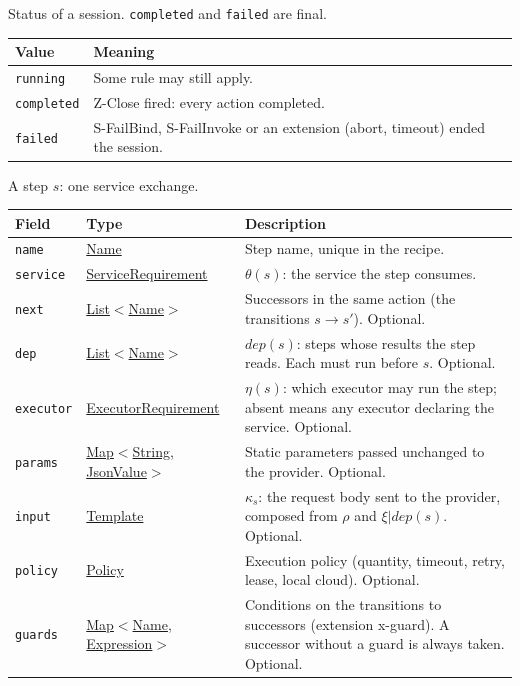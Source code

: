 \documentclass[a4paper]{arrowhead}
\newcommand{\mref}[1]{{\textcolor{ArrowheadPurple}{\hyperref[sec:model:#1]{#1}}}}
\newcommand{\pref}[1]{{\textcolor{ArrowheadGrey}{\hyperref[sec:model:primitives:#1]{#1}}}}
\begin{document}
Status of a session. \texttt{completed} and \texttt{failed} are final.

{\small
\begin{longtable}{|p{3.9cm}|p{11.9cm}|}

\hline
\rowcolor{gray!33} Value & Meaning \\ \hline
\endhead
\texttt{running} & Some rule may still apply. \\ \hline
\texttt{completed} & Z-Close fired: every action completed. \\ \hline
\texttt{failed} & S-FailBind, S-FailInvoke or an extension (abort, timeout) ended the session. \\ \hline
\end{longtable}
}

A step $s$: one service exchange.

{\small
\begin{longtable}{|p{3.9cm}|p{4.4cm}|p{7.5cm}|}

\hline
\rowcolor{gray!33} Field & Type & Description \\ \hline
\endhead
\texttt{name} & \pref{Name} & Step name, unique in the recipe. \\ \hline
\texttt{service} & \mref{ServiceRequirement} & $\theta(s)$: the service the step consumes. \\ \hline
\texttt{next} & \pref{List}$<$\pref{Name}$>$ & Successors in the same action (the transitions $s \rightarrow s'$). Optional. \\ \hline
\texttt{dep} & \pref{List}$<$\pref{Name}$>$ & $dep(s)$: steps whose results the step reads. Each must run before $s$. Optional. \\ \hline
\texttt{executor} & \mref{ExecutorRequirement} & $\eta(s)$: which executor may run the step; absent means any executor declaring the service. Optional. \\ \hline
\texttt{params} & \pref{Map}$<$\pref{String}, \pref{JsonValue}$>$ & Static parameters passed unchanged to the provider. Optional. \\ \hline
\texttt{input} & \pref{Template} & $\kappa_s$: the request body sent to the provider, composed from $\rho$ and $\xi|dep(s)$. Optional. \\ \hline
\texttt{policy} & \mref{Policy} & Execution policy (quantity, timeout, retry, lease, local cloud). Optional. \\ \hline
\texttt{guards} & \pref{Map}$<$\pref{Name}, \pref{Expression}$>$ & Conditions on the transitions to successors (extension x-guard). A successor without a guard is always taken. Optional. \\ \hline
\end{longtable}
}
\end{document}
